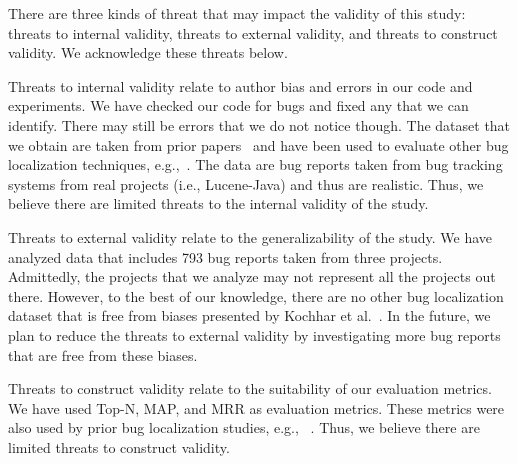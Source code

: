 There are three kinds of threat that may impact the validity of this study: threats to internal validity, threats to external validity, and threats to construct validity. We acknowledge these threats below.

Threats to internal validity relate to author bias and errors in our code and experiments. We have checked our code for bugs and fixed any that we can identify. There may still be errors that we do not notice though. The dataset that we obtain are taken from prior papers~\cite{zhou2012should,KochharTL14} and have been used to evaluate other bug localization techniques, e.g.,~\cite{zhou2012should,SahaLKP14,huo2016learning}. The data are bug reports taken from bug tracking systems from real projects (i.e., Lucene-Java) and thus are realistic. Thus, we believe there are limited threats to the internal validity of the study. 

Threats to external validity relate to the generalizability of the study. We have analyzed data that includes 793 bug reports taken from three projects. Admittedly, the projects that we analyze may not represent all the projects out there. However, to the best of our knowledge, there are no other bug localization dataset that is free from biases presented by Kochhar et al.~\cite{KochharTL14}. In the future, we plan to reduce the threats to external validity by investigating more bug reports that are free from these biases. %

Threats to construct validity relate to the suitability of our evaluation metrics. We have used Top-N, MAP, and MRR as evaluation metrics. These metrics were also used by prior bug localization studies, e.g.,  ~\cite{zhou2012should,SahaLKP14,huo2016learning}. Thus, we believe there are limited threats to construct validity. 